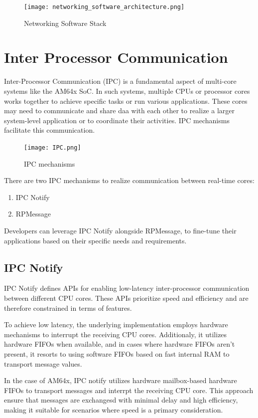 \begin{figure}[ht]
    \centering
    \texttt{[image: networking\_software\_architecture.png]}
    \caption{Networking Software Stack}
\end{figure}

\section{Inter Processor Communication}

Inter-Processor Communication (IPC) is a fundamental aspect of multi-core
systems like the AM64x SoC. In such systems, multiple CPUs or processor cores
works together to achieve specific tasks or run various applications.
These cores may need to communicate and share daa with each other to realize a
larger system-level application or to coordinate their activities.
IPC mechanisms facilitate this communication.

\begin{figure}[ht]
    \centering
    \texttt{[image: IPC.png]}
    \caption{IPC mechanisms}
\end{figure}

There are two IPC mechanisms to realize communication between real-time cores:

\begin{enumerate}
    \item   IPC Notify
    \item   RPMessage
\end{enumerate}

Developers can leverage IPC Notify alongside RPMessage, to fine-tune their
applications based on their specific needs and requirements.

\subsection{IPC Notify}

IPC Notify defines APIs for enabling low-latency inter-processor communication
between different CPU cores. These APIs prioritize speed and efficiency and are
therefore constrained in terms of features.

To achieve low latency, the underlying implementation employs hardware
mechanisms to interrupt the receiving CPU cores. Additionaly, it utilizes
hardware FIFOs when available, and in cases where hardware FIFOs aren't
present, it resorts to using software FIFOs based on fast internal RAM to
transport message values.

In the case of AM64x, IPC notify utilizes hardware mailbox-based hardware FIFOs
to transport messages and interrpt the receiving CPU core.
This approach ensure that messages are exchangesd with minimal delay and high
efficiency, making it suitable for scenarios where speed is a primary
consideration.

